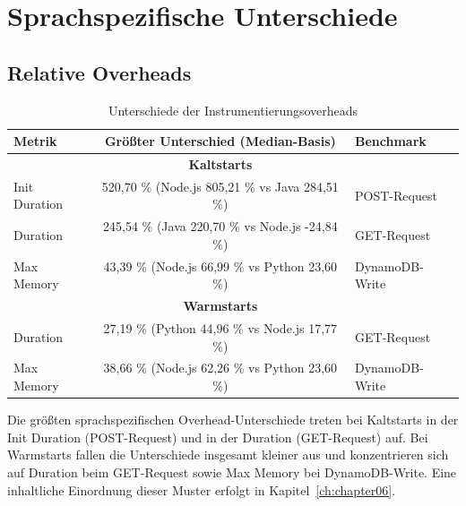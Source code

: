 \section{Sprachspezifische Unterschiede}
\subsection{Relative Overheads}
\begin{table}[H]
\centering
\footnotesize
\setlength{\tabcolsep}{8pt}
\caption{Unterschiede der Instrumentierungsoverheads}
\label{res:ranking-largest-differences-overhead}
\begin{tabular}{|l|c|l|}
\hline
\textbf{Metrik} & \textbf{Größter Unterschied (Median-Basis)} & \textbf{Benchmark} \\
\hline
& \textbf{Kaltstarts} & \\
\hline
Init Duration & 520,70 \% (Node.js 805,21 \% vs Java 284,51 \%) & POST-Request \\
\hline
Duration & 245,54 \% (Java 220,70 \% vs Node.js -24,84 \%) & GET-Request \\
\hline
Max Memory & 43,39 \% (Node.js 66,99 \% vs Python 23,60 \%) & DynamoDB-Write \\
\hline
& \textbf{Warmstarts} & \\
\hline
Duration & 27,19 \% (Python 44,96 \% vs Node.js 17,77 \%) & GET-Request \\
\hline
Max Memory & 38,66 \% (Node.js 62,26 \% vs Python 23,60 \%) & DynamoDB-Write \\
\hline
\end{tabular}
\end{table}

Die größten sprachspezifischen Overhead-Unterschiede treten bei Kaltstarts in der Init Duration (POST-Request) und in der Duration (GET-Request) auf. Bei Warmstarts fallen die Unterschiede insgesamt kleiner aus und konzentrieren sich auf Duration beim GET-Request sowie Max Memory bei DynamoDB-Write. Eine inhaltliche Einordnung dieser Muster erfolgt in Kapitel~\ref{ch:chapter06}.


